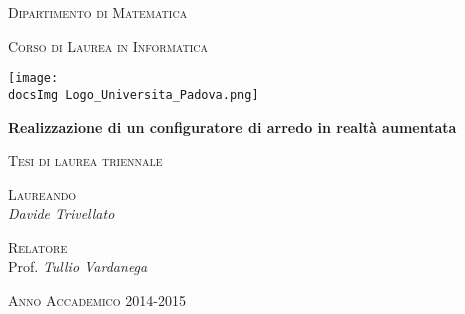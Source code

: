 \begin{titlepage}
	\centering
	{\scshape\LARGE Dipartimento di Matematica \par}
	\vspace{1cm}
	{\scshape\Large Corso di Laurea in Informatica\par}
	\vspace{1.5cm}
	
	\texttt{[image: \\docsImg Logo\_Universita\_Padova.png]}
	\vspace{1cm}
	
	{\huge\bfseries Realizzazione di un configuratore di arredo in realtà aumentata \par}
	\vspace{0.5cm}
	{\scshape\Large Tesi di laurea triennale\par}
	\vspace{1.5cm}
	
	{\raggedright \textsc{Laureando} \\ \Large\itshape Davide Trivellato\par}
	\vfill
	{\raggedleft \textsc{Relatore} \\ Prof. \Large\itshape Tullio Vardanega\par}
	
	\vfill
	
	{\large \textsc{Anno Accademico 2014-2015}}
\end{titlepage}